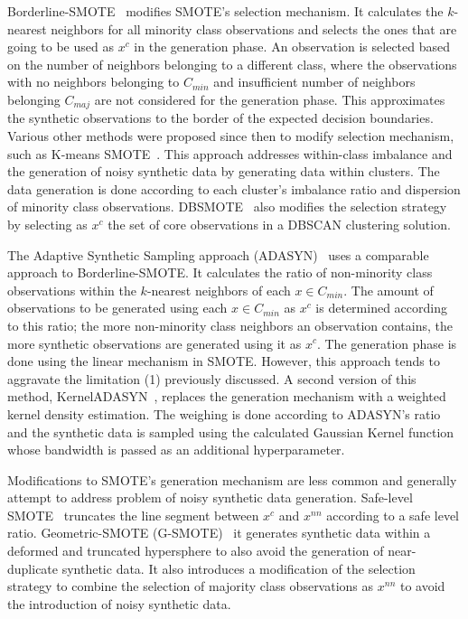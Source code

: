 \documentclass[parskip=full]{scrartcl}
\begin{document}
Borderline-SMOTE~\cite{han2005borderline} modifies SMOTE's selection
mechanism. It calculates the $k$-nearest neighbors for all minority class
observations and selects the ones that are going to be used as $x^c$ in the
generation phase. An observation is selected based on the number of neighbors
belonging to a different class, where the observations with no neighbors
belonging to $C_{min}$ and insufficient number of neighbors belonging
$C_{maj}$ are not considered for the generation phase. This approximates the
synthetic observations to the border of the expected decision boundaries.
Various other methods were proposed since then to modify selection mechanism,
such as K-means SMOTE~\cite{douzas2018improving}. This approach addresses
within-class imbalance and the generation of noisy synthetic data by
generating data within clusters. The data generation is done according to each
cluster's imbalance ratio and dispersion of minority class observations.
DBSMOTE~\cite{bunkhumpornpat2012dbsmote} also modifies the selection strategy
by selecting as $x^c$ the set of core observations in a DBSCAN clustering
solution.

The Adaptive Synthetic Sampling approach (ADASYN)~\cite{he2008adasyn} uses a
comparable approach to Borderline-SMOTE\@. It calculates the ratio of
non-minority class observations within the $k$-nearest neighbors of each $x
\in C_{min}$. The amount of observations to be generated using each $x \in
C_{min}$ as $x^c$ is determined according to this ratio; the more non-minority
class neighbors an observation contains, the more synthetic observations are
generated using it as $x^c$. The generation phase is done using the linear
mechanism in SMOTE\@. However, this approach tends to aggravate the limitation
(1) previously discussed. A second version of this method,
KernelADASYN~\cite{tang2015kerneladasyn}, replaces the generation mechanism
with a weighted kernel density estimation. The weighing is done according to
ADASYN's ratio and the synthetic data is sampled using the calculated Gaussian
Kernel function whose bandwidth is passed as an additional hyperparameter.

Modifications to SMOTE's generation mechanism are less common and generally
attempt to address problem of noisy synthetic data generation. Safe-level
SMOTE~\cite{bunkhumpornpat2009safe} truncates the line segment between $x^c$
and $x^{nn}$ according to a safe level ratio. Geometric-SMOTE
(G-SMOTE)~\cite{douzas2019geometric} it generates synthetic data within a
deformed and truncated hypersphere to also avoid the generation of
near-duplicate synthetic data. It also introduces a modification of the
selection strategy to combine the selection of majority class observations as
$x^{nn}$ to avoid the introduction of noisy synthetic data. 
\end{document}

